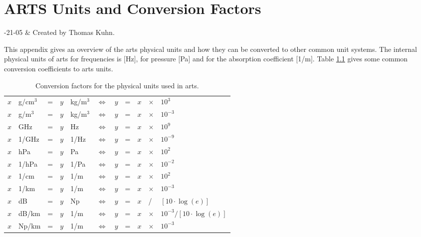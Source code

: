 \chapter{ARTS Units and Conversion Factors}
 \label{app:arts_units}


-21-05 & Created by Thomas Kuhn. \\
\stophistory

 This appendix gives an overview of the arts physical units 
 and how they can be converted to other common unit systems.
 The internal physical units of arts for frequencies is $[$Hz$]$,
 for pressure $[$Pa$]$ and for the absorption coefficient $[$1/m$]$.
 Table \ref{tab:app_arts_units} gives some common conversion
 coefficients to arts units.

\begin{table}[!thb]
  \begin{center}
  \begin{tabular}{lllllllllll}
   \hline
   $x$ & g/cm$^3$ & = & $y$ & kg/m$^3$ & $\Leftrightarrow$ & $y$ & = &
   $x$ & $\times$ & $10^{3}$ \\
   $x$ & g/m$^3$  & = & $y$ & kg/m$^3$ & $\Leftrightarrow$ & $y$ & = & $x$ & $\times$ & $10^{-3}$ \\
   $x$ & GHz      & = & $y$ & Hz       & $\Leftrightarrow$ & $y$ & = & $x$ & $\times$ & $ 10^{9}$ \\
   $x$ & 1/GHz    & = & $y$ & 1/Hz     & $\Leftrightarrow$ & $y$ & = & $x$ & $\times$ & $10^{-9}$ \\
   $x$ & hPa      & = & $y$ & Pa       & $\Leftrightarrow$ & $y$ & = & $x$ & $\times$ & $10^{2}$ \\
   $x$ & 1/hPa    & = & $y$ & 1/Pa     & $\Leftrightarrow$ & $y$ & = & $x$ & $\times$ & $10^{-2}$ \\
   $x$ & 1/cm     & = & $y$ & 1/m      & $\Leftrightarrow$ & $y$ & = & $x$ & $\times$ & $10^{2}$ \\
   $x$ & 1/km     & = & $y$ & 1/m      & $\Leftrightarrow$ & $y$ & = & $x$ & $\times$ & $10^{-3}$ \\
   $x$ & dB       & = & $y$ & Np       & $\Leftrightarrow$ & $y$ & = & $x$ & / & $[10\cdot\log{(e)}]$ \\
   $x$ & dB/km    & = & $y$ & 1/m      & $\Leftrightarrow$ & $y$ & = &
   $x$ & $\times$ & $10^{-3} / [10\cdot\log{(e)}]$ \\
   $x$ & Np/km    & = & $y$ & 1/m      & $\Leftrightarrow$ & $y$ & = & $x$ & $\times$ & $10^{-3}$ \\
   \hline
 \end{tabular}
 \end{center}
 \caption{Conversion factors for the physical units used in arts.}
 \label{tab:app_arts_units}
\end{table}

